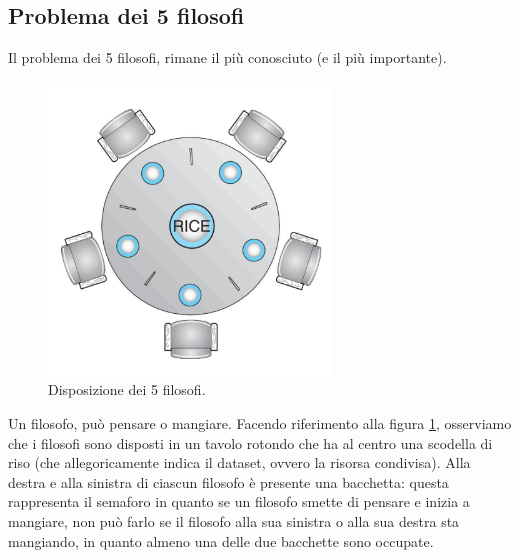 \subsection{Problema dei 5 filosofi}\label{5_filosofi}
Il problema dei 5 filosofi, rimane il più conosciuto (e il più importante).
\begin{figure}[t!]
    \centering
    \includegraphics[width = .5\textwidth]{../res/imgs/synchronization/5_filosofi.png}
    \caption{Disposizione dei 5 filosofi.}
    \label{fig:5_filosofi}
\end{figure}
Un filosofo, può pensare o mangiare. Facendo riferimento alla figura \ref{fig:5_filosofi}, osserviamo che i filosofi sono disposti in un tavolo rotondo che ha al centro una scodella di riso (che allegoricamente indica il dataset, ovvero la risorsa condivisa). Alla destra e alla sinistra di ciascun filosofo è presente una bacchetta: questa rappresenta il semaforo in quanto se un filosofo smette di pensare e inizia a mangiare, non può farlo se il filosofo alla sua sinistra o alla sua destra sta mangiando, in quanto almeno una delle due bacchette sono occupate.

